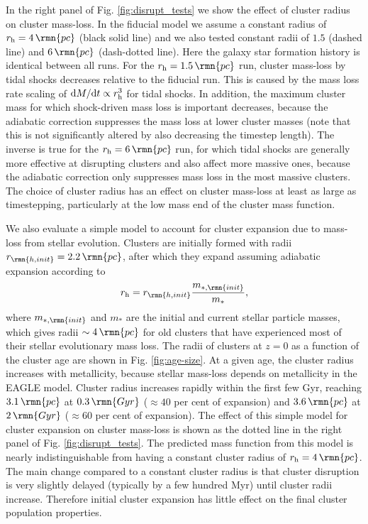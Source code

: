 \documentclass[fleqn,usenatbib]{mnras}
\newcommand\Gyr{\,\rmn{Gyr}}
\newcommand\pc{\,\rmn{pc}}
\begin{document}
In the right panel of Fig. \ref{fig:disrupt_tests} we show the effect of cluster radius on cluster mass-loss.  In the fiducial model we assume a constant radius of $r_{\rm h} = 4 \pc$ (black solid line) and we also tested constant radii of $1.5$ (dashed line) and $6 \pc$ (dash-dotted line). Here the galaxy star formation history is identical between all runs.
For the $r_{\rm h} = 1.5 \pc$ run, cluster mass-loss by tidal shocks decreases relative to the fiducial run. This is caused by the mass loss rate scaling of ${\rm d}M/{\rm d}t\propto r_{\rm h}^3$ for tidal shocks. In addition, the maximum cluster mass for which shock-driven mass loss is important decreases, because the adiabatic correction suppresses the mass loss at lower cluster masses (note that this is not significantly altered by also decreasing the timestep length). The inverse is true for the $r_{\rm h} = 6 \pc$ run, for which tidal shocks are generally more effective at disrupting clusters and also affect more massive ones, because the adiabatic correction only suppresses mass loss in the most massive clusters. The choice of cluster radius has an effect on cluster mass-loss at least as large as timestepping, particularly at the low mass end of the cluster mass function. 

We also evaluate a simple model to account for cluster expansion due to mass-loss from stellar evolution. Clusters are initially formed with radii $r_{\rmn{h,init}} = 2.2 \pc$, after which they expand assuming adiabatic expansion according to 
\begin{equation}
r_{\rm h} = r_{\rmn{h,init}} \frac{ m_{\ast,\rmn{init}} }{ m_\ast } , 
\end{equation}
where $m_{\ast,\rmn{init}}$ and $m_\ast$ are the initial and current stellar particle masses, which gives radii $\sim4 \pc$ for old clusters that have experienced most of their stellar evolutionary mass loss. The radii of clusters at $z=0$ as a function of the cluster age are shown in Fig. \ref{fig:age-size}. At a given age, the cluster radius increases with metallicity, because stellar mass-loss depends on metallicity in the EAGLE model. Cluster radius increases rapidly within the first few Gyr, reaching $3.1 \pc$ at $0.3 \Gyr$ ($\approx 40$ per cent of expansion) and $3.6 \pc$ at $2 \Gyr$ ($\approx 60$ per cent of expansion).
The effect of this simple model for cluster expansion on cluster mass-loss is shown as the dotted line in the right panel of Fig. \ref{fig:disrupt_tests}. The predicted mass function from this model is nearly indistinguishable from having a constant cluster radius of $r_{\rm h} = 4 \pc$. The main change compared to a constant cluster radius is that cluster disruption is very slightly delayed (typically by a few hundred Myr) until cluster radii increase. Therefore initial cluster expansion has little effect on the final cluster population properties. 
\end{document}

